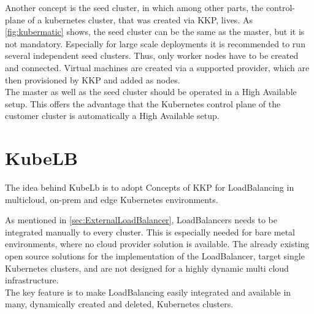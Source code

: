 Another concept is the seed cluster, in which among other parts, the control-plane of a kubernetes cluster, that was created via KKP, lives.
As \autoref{fig:kubermatic} shows, the seed cluster can be the same as the master, but it is not mandatory.
Especially for large scale deployments it is recommended to run several independent seed clusters.
Thus, only worker nodes have to be created and connected.
Virtual machines are created via a supported provider, which are then provisioned by KKP and added as nodes.
\\
The master as well as the seed cluster should be operated in a High Available setup.
This offers the advantage that the Kubernetes control plane of the customer cluster is automatically a High Available setup.

\section{KubeLB}

The idea behind KubeLb is to adopt Concepts of KKP for LoadBalancing in multicloud, on-prem and edge Kubernetes environments.

As mentioned in \autoref{sec:ExternalLoadBalancer}, LoadBalancers needs to be integrated manually to every cluster.
This is especially needed for bare metal environments, where no cloud provider solution is available.
The already existing open source solutions for the implementation of the LoadBalancer, target single Kubernetes clusters, and are not designed for a highly dynamic multi cloud infrastructure.
\\
The key feature is to make LoadBalancing easily integrated and available in many, dynamically created and deleted, Kubernetes clusters.



